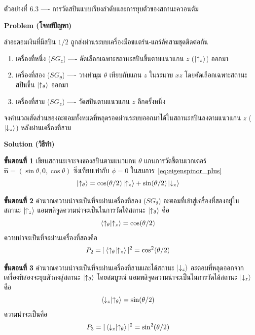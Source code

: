 \begin{psctbox}{ตัวอย่างที่ 6.3 ---- การวัดสปินแบบเรียงลำดับและการยุบตัวของสถานะควอนตัม}

\textbf{Problem (โจทย์ปัญหา)}

ลำอะตอมเงินที่มีสปิน $1/2$ ถูกส่งผ่านระบบเครื่องมือชแตร์น-แกร์ลัคสามชุดติดต่อกัน
\begin{enumerate}
    \item เครื่องที่หนึ่ง ($SG_z$) ---- คัดเลือกเฉพาะสถานะสปินขึ้นตามแนวแกน $z$ ($\ket{\uparrow_z}$) ออกมา
    \item เครื่องที่สอง ($SG_\theta$) ---- วางทำมุม $\theta$ เทียบกับแกน $z$ ในระนาบ $xz$ โดยคัดเลือกเฉพาะสถานะสปินขึ้น $\ket{\uparrow_\theta}$ ออกมา
    \item เครื่องที่สาม ($SG_z$) ---- วัดสปินตามแนวแกน $z$ อีกครั้งหนึ่ง
\end{enumerate}
จงคำนวณสัดส่วนของอะตอมทั้งหมดที่หลุดรอดผ่านระบบออกมาได้ในสถานะสปินลงตามแนวแกน $z$ ($\ket{\downarrow_z}$) หลังผ่านเครื่องที่สาม

\textbf{Solution (วิธีทำ)}

\textbf{ขั้นตอนที่ 1} เขียนสถานะเจาะจงของสปินตามแนวแกน $\theta$
แกนการวัดชี้ตามเวกเตอร์ $\hat{\mathbf{n}} = (\sin\theta, 0, \cos\theta)$ ซึ่งเทียบเท่ากับ $\phi = 0$ ในสมการ~\eqref{eq:eigenspinor_plus}
\begin{equation*}
\ket{\uparrow_\theta} = \cos(\theta/2) \ket{\uparrow_z} + \sin(\theta/2) \ket{\downarrow_z}
\end{equation*}

\textbf{ขั้นตอนที่ 2} คำนวณความน่าจะเป็นที่จะผ่านเครื่องที่สอง ($SG_\theta$)
อะตอมที่เข้าสู่เครื่องที่สองอยู่ในสถานะ $\ket{\uparrow_z}$ แอมพลิจูดความน่าจะเป็นในการวัดได้สถานะ $\ket{\uparrow_\theta}$ คือ
\begin{equation*}
\braket{\uparrow_\theta}{\uparrow_z} = \cos(\theta/2)
\end{equation*}
ความน่าจะเป็นที่จะผ่านเครื่องที่สองคือ
\begin{equation*}
P_2 = |\braket{\uparrow_\theta}{\uparrow_z}|^2 = \cos^2(\theta/2)
\end{equation*}

\textbf{ขั้นตอนที่ 3} คำนวณความน่าจะเป็นที่จะผ่านเครื่องที่สามและได้สถานะ $\ket{\downarrow_z}$
อะตอมที่หลุดออกจากเครื่องที่สองจะยุบตัวลงสู่สถานะ $\ket{\uparrow_\theta}$ โดยสมบูรณ์ แอมพลิจูดความน่าจะเป็นในการวัดได้สถานะ $\ket{\downarrow_z}$ คือ
\begin{equation*}
\braket{\downarrow_z}{\uparrow_\theta} = \sin(\theta/2)
\end{equation*}
ความน่าจะเป็นคือ
\begin{equation*}
P_3 = |\braket{\downarrow_z}{\uparrow_\theta}|^2 = \sin^2(\theta/2)
\end{equation*}


\end{psctbox}
